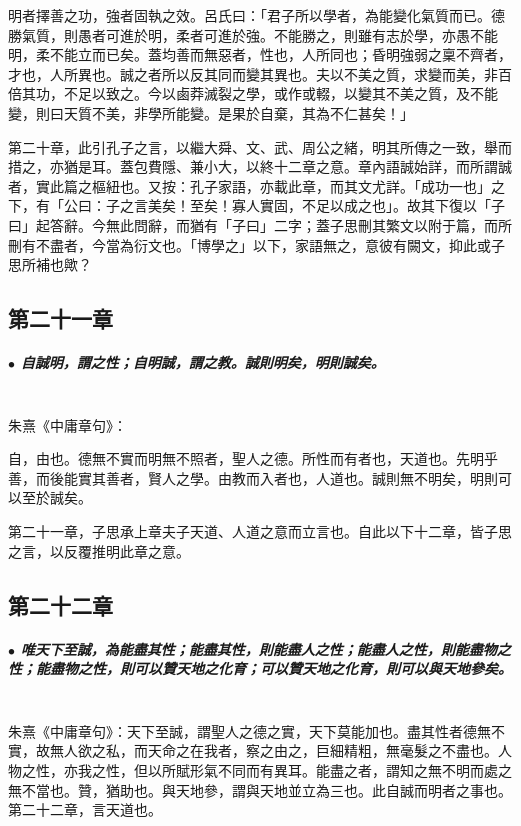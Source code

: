 \documentclass[hyperref, UTF8, 12pt, a4paper]{ctexrep}
\begin{document}
\begin{adjustwidth}{2cm}{1cm}
\indent\indent 明者擇善之功，強者固執之效。呂氏曰：「君子所以學者，為能變化氣質而已。德勝氣質，則愚者可進於明，柔者可進於強。不能勝之，則雖有志於學，亦愚不能明，柔不能立而已矣。蓋均善而無惡者，性也，人所同也；昏明強弱之稟不齊者，才也，人所異也。誠之者所以反其同而變其異也。夫以不美之質，求變而美，非百倍其功，不足以致之。今以鹵莽滅裂之學，或作或輟，以變其不美之質，及不能變，則曰天質不美，非學所能變。是果於自棄，其為不仁甚矣！」

第二十章，此引孔子之言，以繼大舜、文、武、周公之緒，明其所傳之一致，舉而措之，亦猶是耳。蓋包費隱、兼小大，以終十二章之意。章內語誠始詳，而所謂誠者，實此篇之樞紐也。又按：孔子家語，亦載此章，而其文尤詳。「成功一也」之下，有「公曰：子之言美矣！至矣！寡人實固，不足以成之也」。故其下復以「子曰」起答辭。今無此問辭，而猶有「子曰」二字；蓋子思刪其繁文以附于篇，而所刪有不盡者，今當為衍文也。「博學之」以下，家語無之，意彼有闕文，抑此或子思所補也歟？
\end{adjustwidth}

\newpage
\subsection{第二十一章}

\subparagraph{$\bullet$ 自誠明，謂之性；自明誠，謂之教。誠則明矣，明則誠矣。} ~\\

朱熹《中庸章句》：

\begin{adjustwidth}{2cm}{1cm}
\indent\indent 自，由也。德無不實而明無不照者，聖人之德。所性而有者也，天道也。先明乎善，而後能實其善者，賢人之學。由教而入者也，人道也。誠則無不明矣，明則可以至於誠矣。

第二十一章，子思承上章夫子天道、人道之意而立言也。自此以下十二章，皆子思之言，以反覆推明此章之意。
\end{adjustwidth}

\newpage
\subsection{第二十二章}

\subparagraph{$\bullet$ 唯天下至誠，為能盡其性；能盡其性，則能盡人之性；能盡人之性，則能盡物之性；能盡物之性，則可以贊天地之化育；可以贊天地之化育，則可以與天地參矣。} ~\\

朱熹《中庸章句》：天下至誠，謂聖人之德之實，天下莫能加也。盡其性者德無不實，故無人欲之私，而天命之在我者，察之由之，巨細精粗，無毫髮之不盡也。人物之性，亦我之性，但以所賦形氣不同而有異耳。能盡之者，謂知之無不明而處之無不當也。贊，猶助也。與天地參，謂與天地並立為三也。此自誠而明者之事也。第二十二章，言天道也。
\end{document}
